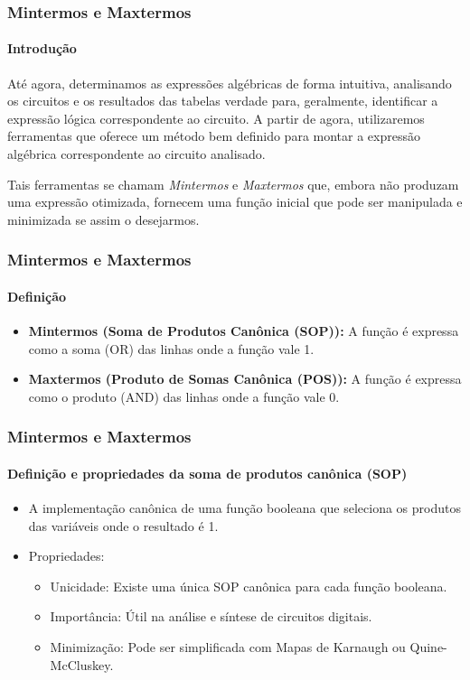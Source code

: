 \begin{frame}
	\frametitle{Mintermos e Maxtermos}
	\framesubtitle{Introdução}
	\par Até agora, determinamos as expressões algébricas de forma intuitiva, analisando os circuitos e os resultados das tabelas verdade para, geralmente, identificar a expressão lógica correspondente ao circuito. A partir de agora, utilizaremos ferramentas que oferece um método bem definido para montar a expressão algébrica correspondente ao circuito analisado.
	\par Tais ferramentas se chamam \textit{Mintermos} e \textit{Maxtermos} que, embora não produzam uma expressão otimizada, fornecem uma função inicial que pode ser manipulada e minimizada se assim o desejarmos.
\end{frame}

\begin{frame}
	\frametitle{Mintermos e Maxtermos}
	\framesubtitle{Definição}
	\begin{itemize}
		\item \textbf{Mintermos (Soma de Produtos Canônica (SOP)):} A função é expressa como a soma (OR) das linhas onde a função vale 1.
		\item \textbf{Maxtermos (Produto de Somas Canônica (POS)):} A função é expressa como o produto (AND) das linhas onde a função vale 0.
	\end{itemize}
\end{frame}

\begin{frame}
	\frametitle{Mintermos e Maxtermos}
	\framesubtitle{Definição e propriedades da soma de produtos canônica (SOP)}
	\begin{itemize}
		\item A implementação canônica de uma função booleana que seleciona os produtos das variáveis onde o resultado é 1.
		\item Propriedades:
		\begin{itemize}
			\item Unicidade: Existe uma única SOP canônica para cada função booleana.
			\item Importância: Útil na análise e síntese de circuitos digitais.
			\item Minimização: Pode ser simplificada com Mapas de Karnaugh ou Quine-McCluskey.
		\end{itemize}
	\end{itemize}
\end{frame}

